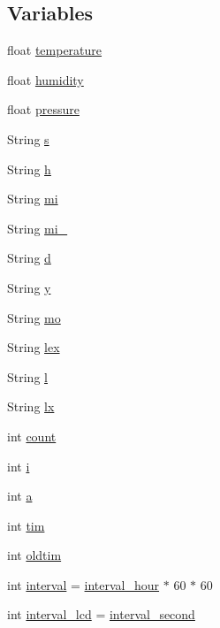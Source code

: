 \subsection*{Variables}
\begin{DoxyCompactItemize}
\item 
float \hyperlink{_w_s_8ino_afc1d28cfbce795d6ea954ebe725241f5}{temperature}
\item 
float \hyperlink{_w_s_8ino_a6a87b2b0cff24d38b367ccd34843a206}{humidity}
\item 
float \hyperlink{_w_s_8ino_ac870e1249bab4a2a68cc4126761d24ef}{pressure}
\item 
String \hyperlink{_w_s_8ino_a5109c1e8d8d5228b4290813adb0be47b}{s}
\item 
String \hyperlink{_w_s_8ino_a5977e838367785a7176dc7d4106df5e3}{h}
\item 
String \hyperlink{_w_s_8ino_a27f338e2e1e0c6b4e800a9a05aeeb00f}{mi}
\item 
String \hyperlink{_w_s_8ino_a941e7622afb12acf931c6da1910cc461}{mi\+\_}
\item 
String \hyperlink{_w_s_8ino_a7e3f4a5179b8e7fc0d3cee2a12bb3f44}{d}
\item 
String \hyperlink{_w_s_8ino_a671dd85f94413cb1d3f4fa1877dded70}{y}
\item 
String \hyperlink{_w_s_8ino_ae87a77f51d231ab5614fdc0cc9734ae9}{mo}
\item 
String \hyperlink{_w_s_8ino_a50a22a42df187974707beaeeb46ee1ec}{lex}
\item 
String \hyperlink{_w_s_8ino_a3d755e761d498d63ec8ff4ba107f9b37}{l}
\item 
String \hyperlink{_w_s_8ino_a27093eb2a51400e98a5a829312514cab}{lx}
\item 
int \hyperlink{_w_s_8ino_ad43c3812e6d13e0518d9f8b8f463ffcf}{count}
\item 
int \hyperlink{_w_s_8ino_acb559820d9ca11295b4500f179ef6392}{i}
\item 
int \hyperlink{_w_s_8ino_aa4c2a5552e9bc49b1816ff532f558c74}{a}
\item 
int \hyperlink{_w_s_8ino_a9ca8357cbbbe8be3c127f66bcc4082f7}{tim}
\item 
int \hyperlink{_w_s_8ino_a8455abbfc4590d0bf845dcd30505e1ce}{oldtim}
\item 
int \hyperlink{_w_s_8ino_ae0c690118932b32ef40a74bb6a259acd}{interval} = \hyperlink{_w_s_8ino_a4e07ce7aef83b2e94bd353d77029423e}{interval\+\_\+hour} $\ast$ 60 $\ast$ 60
\item 
int \hyperlink{_w_s_8ino_a64d680b4be82b34d0731c9dd84986ead}{interval\+\_\+lcd} = \hyperlink{_w_s_8ino_a0a56e85c196bfb2b3bf61abe7f007541}{interval\+\_\+second}

\end{DoxyCompactItemize}
